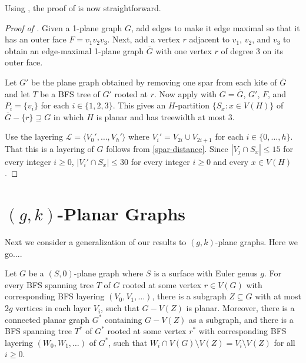 \documentclass{patmorin}
\begin{document}
Using , the proof of  is now straightforward. 

\begin{proof}[Proof of ]
Given a 1-plane graph $G$, add edges to make it edge maximal so that it has an outer face $F=v_1v_2v_3$. Next, add a vertex $r$ adjacent to $v_1$, $v_2$, and $v_3$ to obtain an edge-maximal 1-plane graph $\overline{G}$ with one vertex $r$ of degree 3 on its outer face. 
  
  Let $G'$ be the plane graph obtained by removing one spar from each kite of $\overline{G}$ and let $T$ be a BFS tree of $G'$ rooted at $r$.  Now apply  with $G=\overline{G}$, $G'$, $F$, and $P_i=\{v_i\}$ for each $i\in\{1,2,3\}$.  This gives an $H$-partition $\{S_x:x\in V(H)\}$ of $\overline{G}-\{r\}\supseteq G$ in which $H$ is planar and has treewidth at most 3.
  
  Use the layering $\mathcal{L}=\langle V_0',\ldots,V_h'\rangle$ where $V_i'=V_{2i}\cup V_{2i+1}$ for each $i\in\{0,\ldots,h\}$. That this is a layering of $G$ follows from \eqref{spar-distance}.  Since $|V_j\cap S_x|\le 15$ for every integer $i\ge 0$, $|V_i'\cap S_x|\le 30$ for every integer $i\ge 0$ and every $x\in V(H)$.
\end{proof}

\section{$(g,k)$-Planar Graphs}

Next we consider a generalization of our results to $(g,k)$-plane graphs.  
Here we go....


\begin{lem} 
Let $G$ be a $(S,0)$-plane graph where $S$ is a surface with Euler genus $g$. 
For every BFS spanning tree $T$ of $G$ rooted at some vertex $r\in V(G)$ with corresponding BFS layering $(V_0,V_1,\dots)$, 
there is a subgraph $Z\subseteq G$ with at most $2g$ vertices in each layer $V_i$, such that $G-V(Z)$ is planar. 
Moreover, there is a connected planar graph $G^*$ containing $G-V(Z)$ as a subgraph, and 
there is a BFS spanning tree $T^*$ of $G^*$ rooted at some vertex $r^*$ 
with corresponding BFS layering $(W_0,W_1,\dots)$ of $G^*$, 
such that  $W_{i} \cap V(G) \setminus V(Z) = V_i  \setminus V(Z)$ for all $i\geq 0$.
\end{lem}
\end{document}
